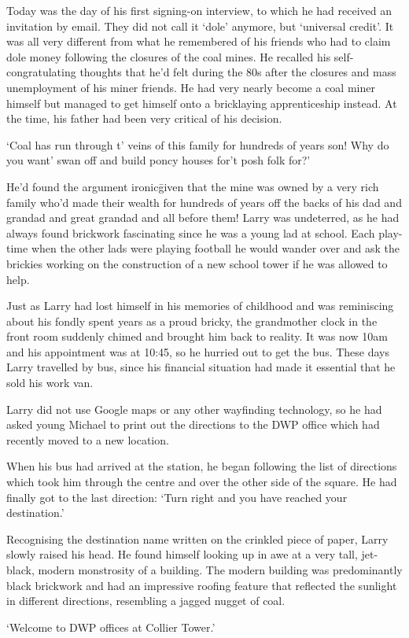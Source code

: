 Today was the day of his first signing-on interview, to which he had
received an invitation by email. They did not call it `dole' anymore,
but `universal credit'. It was all very different from what he
remembered of his friends who had to claim dole money following the
closures of the coal mines. He recalled his self-congratulating
thoughts that he'd felt during the 80s after the closures and mass
unemployment of his miner friends. He had very nearly become a coal
miner himself but managed to get himself onto a bricklaying
apprenticeship instead. At the time, his father had been very critical
of his decision.

`Coal has run through t' veins of this family for hundreds of years
son! Why do you want' swan off and build poncy houses for't posh folk
for?'

He'd found the argument ironic\=given that the mine was owned by a
very rich family who'd made their wealth for hundreds of years off the
backs of his dad and grandad and great grandad and all before them!
Larry was undeterred, as he had always found brickwork fascinating
since he was a young lad at school. Each play-time when the other lads
were playing football he would wander over and ask the brickies
working on the construction of a new school tower if he was allowed to
help.

Just as Larry had lost himself in his memories of childhood and was
reminiscing about his fondly spent years as a proud bricky, the
grandmother clock in the front room suddenly chimed and brought him
back to reality. It was now 10am and his appointment was at 10:45, so he
hurried out to get the bus. These days Larry travelled by bus, since
his financial situation had made it essential that he sold his work
van.

Larry did not use Google maps or any other wayfinding technology, so
he had asked young Michael to print out the directions to the DWP
office which had recently moved to a new location.

When his bus had arrived at the station, he began following the list
of directions which took him through the centre and over the other
side of the square. He had finally got to the last direction: `Turn
right and you have reached your destination.'

Recognising the destination name written on the crinkled piece of
paper, Larry slowly raised his head. He found himself looking up in
awe at a very tall, jet-black, modern monstrosity of a building. The
modern building was predominantly black brickwork and had an
impressive roofing feature that reflected the sunlight in different
directions, resembling a jagged nugget of coal.

`Welcome to DWP offices at Collier Tower.'





